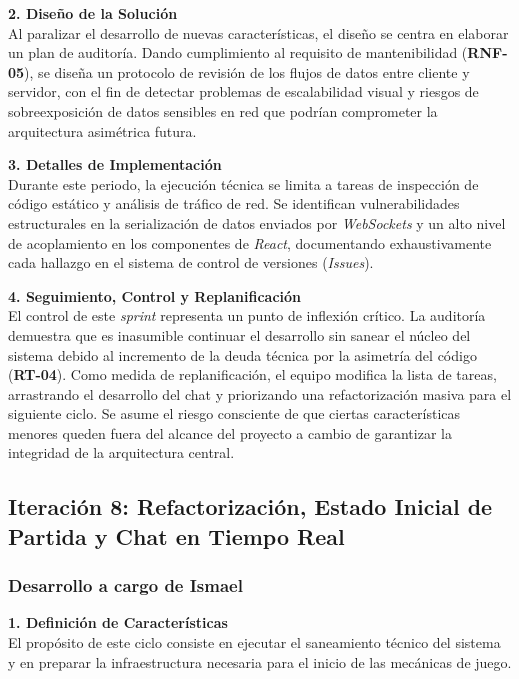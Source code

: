 \textbf{2. Diseño de la Solución} \\
Al paralizar el desarrollo de nuevas características, el diseño se centra en elaborar un plan de auditoría. Dando cumplimiento al requisito de mantenibilidad (\textbf{RNF-05}), se diseña un protocolo de revisión de los flujos de datos entre cliente y servidor, con el fin de detectar problemas de escalabilidad visual y riesgos de sobreexposición de datos sensibles en red que podrían comprometer la arquitectura asimétrica futura.

\textbf{3. Detalles de Implementación} \\
Durante este periodo, la ejecución técnica se limita a tareas de inspección de código estático y análisis de tráfico de red. Se identifican vulnerabilidades estructurales en la serialización de datos enviados por \textit{WebSockets} y un alto nivel de acoplamiento en los componentes de \textit{React}, documentando exhaustivamente cada hallazgo en el sistema de control de versiones (\textit{Issues}).

\textbf{4. Seguimiento, Control y Replanificación} \\
El control de este \textit{sprint} representa un punto de inflexión crítico. La auditoría demuestra que es inasumible continuar el desarrollo sin sanear el núcleo del sistema debido al incremento de la deuda técnica por la asimetría del código (\textbf{RT-04}). Como medida de replanificación, el equipo modifica la lista de tareas, arrastrando el desarrollo del chat y priorizando una refactorización masiva para el siguiente ciclo. Se asume el riesgo consciente de que ciertas características menores queden fuera del alcance del proyecto a cambio de garantizar la integridad de la arquitectura central.

\subsection{Iteración 8: Refactorización, Estado Inicial de Partida y Chat en Tiempo Real}

\subsubsection*{Desarrollo a cargo de Ismael}
\textbf{1. Definición de Características} \\
El propósito de este ciclo consiste en ejecutar el saneamiento técnico del sistema y en preparar la infraestructura necesaria para el inicio de las mecánicas de juego. 

